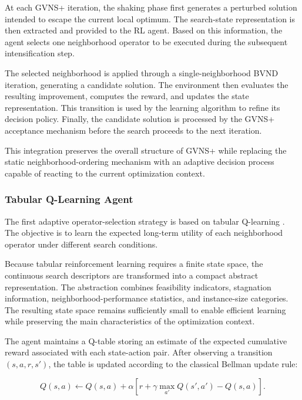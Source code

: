At each GVNS+ iteration, the shaking phase first generates a perturbed solution intended to escape the current local optimum. The search-state representation is then extracted and provided to the RL agent. Based on this information, the agent selects one neighborhood operator to be executed during the subsequent intensification step.

The selected neighborhood is applied through a single-neighborhood BVND iteration, generating a candidate solution. The environment then evaluates the resulting improvement, computes the reward, and updates the state representation. This transition is used by the learning algorithm to refine its decision policy. Finally, the candidate solution is processed by the GVNS+ acceptance mechanism before the search proceeds to the next iteration.

This integration preserves the overall structure of GVNS+ while replacing the static neighborhood-ordering mechanism with an adaptive decision process capable of reacting to the current optimization context.

\subsubsection{Tabular Q-Learning Agent}
The first adaptive operator-selection strategy is based on tabular Q-learning \cite{sutton2018reinforcement}. The objective is to learn the expected long-term utility of each neighborhood operator under different search conditions.

Because tabular reinforcement learning requires a finite state space, the continuous search descriptors are transformed into a compact abstract representation. The abstraction combines feasibility indicators, stagnation information, neighborhood-performance statistics, and instance-size categories. The resulting state space remains sufficiently small to enable efficient learning while preserving the main characteristics of the optimization context.



The agent maintains a Q-table storing an estimate of the expected cumulative reward associated with each state-action pair. After observing a transition $(s,a,r,s')$, the table is updated according to the classical Bellman update rule:

\begin{equation}
Q(s,a)\leftarrow Q(s,a)+
\alpha
\left[
r+\gamma \max_{a'}Q(s',a')
-Q(s,a)
\right].
\end{equation}


